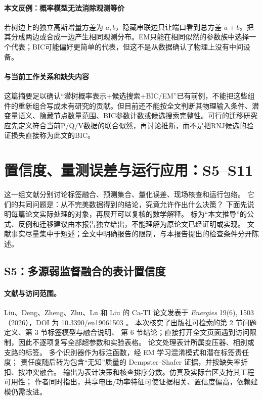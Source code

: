 \documentclass[UTF8,11pt,fontset=fandol]{ctexart}
\theoremstyle{remark}
\numberwithin{equation}{section}
\begin{document}
\paragraph{本文反例：概率模型无法消除观测等价}
若树边上的独立高斯增量方差为 $a,b$，隐藏串联边只让端口看到总方差 $a+b$。把其分成两边或合成一边产生相同观测分布。EM只能在相同似然的参数族中选择一个代表；BIC可能偏好更简单的代表，但这不是从数据确认了物理上没有中间设备。

\paragraph{与当前工作关系和缺失内容}
这篇摘要足以确认“潜树概率表示+候选搜索+BIC/EM”已有前例，不能把这些组件的重新组合写成未有研究的贡献。但目前还不能按全文判断其物理输入条件、潜变量语义、隐藏节点数量范围、BIC参数计数或候选搜索完整性。可行的迁移研究应先定义符合当前P/Q/V数据的联合似然，再讨论推断，而不是把RNJ候选的验证损失直接称为此文的BIC。



\clearpage

\section{置信度、量测误差与运行应用：S5--S11}
\label{sec:engineering}

这一组文献分别讨论标签融合、预测集合、量化误差、现场核查和运行包络。
它们的共同问题是：从不完美数据得到的结论，究竟允许作出什么决策？
下面先说明每篇论文实际处理的对象，再展开可以复核的数学解释。
标为“本文推导”的公式、反例和迁移建议由本报告独立给出，不能理解为原论文已经证明或实现。
文献事实尽量集中于短述；全文中明确报告的限制，与本报告提出的检查条件分开陈述。

\subsection{S5：多源弱监督融合的表计置信度}
\label{subsec:S5}

\paragraph{文献与访问范围。}
Liu、Deng、Zheng、Zhu、Lu 和 Liu 的 Ca-TI 论文发表于
\emph{Energies} 19(6), 1503（2026），DOI 为
\href{https://doi.org/10.3390/en19061503}{10.3390/en19061503} \citep{S5}。
本次核实了出版社可检索的第 2 节问题定义、第 3 节标签模型与融合说明、
第 6 节结论；直接打开全文页面遇到访问限制，因此不逐项复写全部超参数和实验表格。
论文处理表计所属变压器、相别或支路的标签。
多个识别器作为标注函数，经 EM 学习混淆模式和潜在标签责任度；
责任度随后转为包含“无知”质量的 Dempster--Shafer 证据，并按缺失率折扣、按冲突融合。
输出为表计决策和核查排序分数。仿真及实际台区支持其工程可用性；
作者同时指出，共享电压/功率特征可使证据相关、置信度偏高，依赖建模仍需改进。
\end{document}
